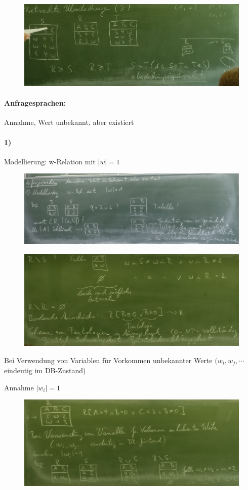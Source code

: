 \documentclass[12pt, a4paper]{article}
\begin{document}
\begin{figure}
\centering
\includegraphics[width=0.7\linewidth]{img/img38}
\caption{}
\label{fig:img38}
\end{figure}

\paragraph{Anfragesprachen:} Annahme, Wert unbekannt, aber existiert

\paragraph{1)} Modellierung: w-Relation mit $|w| = 1$

\begin{figure}
\centering
\includegraphics[width=0.9\linewidth]{img/img39}
\caption{}
\label{fig:img39}
\end{figure}


\begin{figure}
\centering
\includegraphics[width=0.7\linewidth]{img/img40}
\caption{}
\label{fig:img40}
\end{figure}

Bei Verwendung von Variablen für Vorkommen unbekannter Werte $(w_i, w_j, \cdots$ eindeutig im DB-Zustand)

Annahme $|w_i| = 1$
\begin{figure}
\centering
\includegraphics[width=0.7\linewidth]{img/img41}
\caption{}
\label{fig:img41}
\end{figure}
\end{document}
